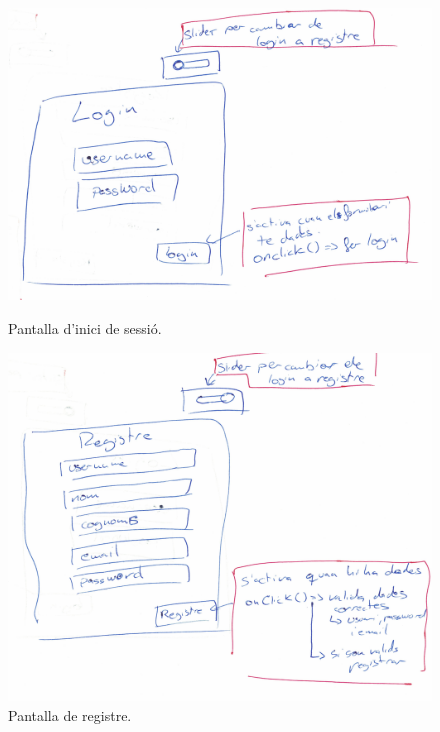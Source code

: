 \begin{figure}[H]
    \centering
    \begin{minipage}{0.48\textwidth}
        \centering
        \includegraphics[width=\linewidth]{Figures/interficies/react-login.jpg}
        \caption{Pantalla d'inici de sessió.}
        \label{fig:react-login}
    \end{minipage}\hfill
    \begin{minipage}{0.48\textwidth}
        \centering
        \includegraphics[width=\linewidth]{Figures/interficies/react-registre.jpg}
        \caption{Pantalla de registre.}
        \label{fig:react-registre}
    \end{minipage}
\end{figure}

